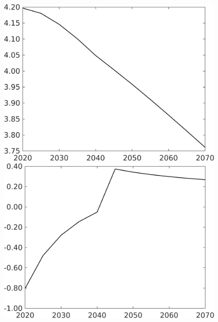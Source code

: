 \documentclass[12pt]{article}
\begin{document}
\begin{figure}[h!!]
\begin{minipage}[]{0.32\textwidth}
	\end{minipage}		
	\begin{minipage}[]{0.32\textwidth}
		\includegraphics[width=1\textwidth]{../../codding_model/own_basedOnFried/optimalPol_010922_revision/figures/all_13Sept22/CompTaufPER_bytaul_Equlab_Reg0_gAf_spillover0_nsk0_xgr0_knspil0_sep1_LFlimit1_emsbase0_countec0_GovRev0_etaa0.79_lgd0.png}
	\end{minipage}		
	\begin{minipage}[]{0.32\textwidth}
		\includegraphics[width=1\textwidth]{../../codding_model/own_basedOnFried/optimalPol_010922_revision/figures/all_13Sept22/CompTaufPER_bytaul_Equlab_Reg0_gAg_spillover0_nsk0_xgr0_knspil0_sep1_LFlimit1_emsbase0_countec0_GovRev0_etaa0.79_lgd0.png}

\end{minipage}
\end{figure}
\end{document}
